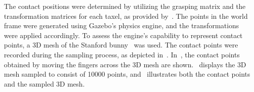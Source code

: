 The contact positions were determined by utilizing the grasping matrix  and the transformation matrices for each taxel, as provided by~\cite{ruppel-philipp-biotac-gazebo-plugin}. The points in the world frame  were generated using Gazebo's physics engine, and the transformations were applied accordingly. To assess the engine's capability to represent contact points, a 3D mesh of the Stanford bunny~\cite{stanford-bunny} was used. The contact points were recorded during the sampling process, as depicted in~. In~, the contact points obtained by moving the fingers across the 3D mesh are shown.~ displays the 3D mesh sampled to consist of \num{10 000} points, and~ illustrates both the contact points and the sampled 3D mesh.



